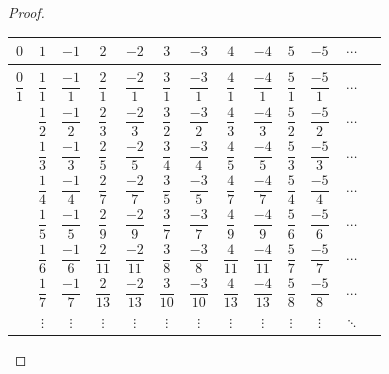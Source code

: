 \documentclass[12pt]{article}
\begin{document}
\begin{enumerate}
\begin{proof}
\begin{tabular}{ccccccccccccc}
$0$ & $1$ & $-1$ & $2$ & $-2$ & $3$ & $-3$ & $4$ & $-4$ & $5$ & $-5$ & $\cdots$ \\
\hline
\\
$\dfrac{0}{1}$ & $\dfrac{1}{1}$ & $\dfrac{-1}{1}$ & $\dfrac{2}{1}$ & $\dfrac{-2}{1}$ & $\dfrac{3}{1}$ & $\dfrac{-3}{1}$ & $\dfrac{4}{1}$ & $\dfrac{-4}{1}$ & $\dfrac{5}{1}$ & $\dfrac{-5}{1}$ & $\cdots$ \\[18pt]
 & $\dfrac{1}{2}$ & $\dfrac{-1}{2}$ & $\dfrac{2}{3}$ & $\dfrac{-2}{3}$ & $\dfrac{3}{2}$ & $\dfrac{-3}{2}$ & $\dfrac{4}{3}$ & $\dfrac{-4}{3}$ & $\dfrac{5}{2}$ & $\dfrac{-5}{2}$ & $\cdots$ \\[18pt]
 & $\dfrac{1}{3}$ & $\dfrac{-1}{3}$ & $\dfrac{2}{5}$ & $\dfrac{-2}{5}$ & $\dfrac{3}{4}$ & $\dfrac{-3}{4}$ & $\dfrac{4}{5}$ & $\dfrac{-4}{5}$ & $\dfrac{5}{3}$ & $\dfrac{-5}{3}$ & $\cdots$ \\[18pt]
 & $\dfrac{1}{4}$ & $\dfrac{-1}{4}$ & $\dfrac{2}{7}$ & $\dfrac{-2}{7}$ & $\dfrac{3}{5}$ & $\dfrac{-3}{5}$ & $\dfrac{4}{7}$ & $\dfrac{-4}{7}$ & $\dfrac{5}{4}$ & $\dfrac{-5}{4}$ & $\cdots$ \\[18pt]
 & $\dfrac{1}{5}$ & $\dfrac{-1}{5}$ & $\dfrac{2}{9}$ & $\dfrac{-2}{9}$ & $\dfrac{3}{7}$ & $\dfrac{-3}{7}$ & $\dfrac{4}{9}$ & $\dfrac{-4}{9}$ & $\dfrac{5}{6}$ & $\dfrac{-5}{6}$ & $\cdots$ \\[18pt]
 & $\dfrac{1}{6}$ & $\dfrac{-1}{6}$ & $\dfrac{2}{11}$ & $\dfrac{-2}{11}$ & $\dfrac{3}{8}$ & $\dfrac{-3}{8}$ & $\dfrac{4}{11}$ & $\dfrac{-4}{11}$ & $\dfrac{5}{7}$ & $\dfrac{-5}{7}$ & $\cdots$ \\[18pt]
 & $\dfrac{1}{7}$ & $\dfrac{-1}{7}$ & $\dfrac{2}{13}$ & $\dfrac{-2}{13}$ & $\dfrac{3}{10}$ & $\dfrac{-3}{10}$ & $\dfrac{4}{13}$ & $\dfrac{-4}{13}$ & $\dfrac{5}{8}$ & $\dfrac{-5}{8}$ & $\cdots$ \\[18pt]
 & $\vdots$ & $\vdots$ & $\vdots$ & $\vdots$ & $\vdots$ & $\vdots$ & $\vdots$ & $\vdots$ & $\vdots$ & $\vdots$ & $\ddots$ \\
\end{tabular}

 \vfill
 \end{proof}
\end{enumerate}
\end{document}
